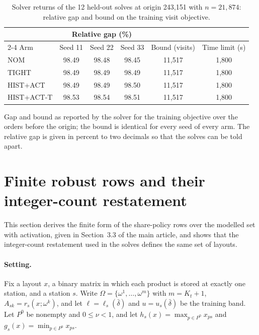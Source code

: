 \documentclass[11pt]{article}
\begin{document}
\begin{table}[htbp]
\centering
\caption{Solver returns of the 12 held-out solves at origin 243,151 with $n=21{,}874$: relative gap and bound on the training visit objective.}
\label{tab:s-solver}
\small
\begin{tabular}{@{}lccccc@{}}
\toprule
 & \multicolumn{3}{c}{Relative gap (\%)} & & \\
\cmidrule(lr){2-4}
Arm & Seed 11 & Seed 22 & Seed 33 & Bound (visits) & Time limit (s) \\
\midrule
NOM        & 98.49 & 98.48 & 98.45 & 11,517 & 1,800 \\
TIGHT      & 98.49 & 98.49 & 98.49 & 11,517 & 1,800 \\
HIST+ACT   & 98.49 & 98.49 & 98.50 & 11,517 & 1,800 \\
HIST+ACT-T & 98.53 & 98.54 & 98.51 & 11,517 & 1,800 \\
\bottomrule
\end{tabular}
\par\smallskip
\begin{minipage}{\linewidth}\footnotesize
Gap and bound as reported by the solver for the training objective over the orders before the origin; the bound is identical for every seed of every arm. The relative gap is given in percent to two decimals so that the solves can be told apart.
\end{minipage}
\end{table}

\section{Finite robust rows and their integer-count restatement}\label{sec:s-rows}
This section derives the finite form of the share-policy rows over the modelled set with activation, given in Section~3.3 of the main article, and shows that the integer-count restatement used in the solves defines the same set of layouts.

\paragraph{Setting.} Fix a layout $x$, a binary matrix in which each product is stored at exactly one station, and a station $s$. Write $\Omega=\{\omega^1,\dots,\omega^m\}$ with $m=K_t+1$, $A_{sk}=r_s(x;\omega^k)$, and let $\ell=\ell_s(\bar\delta)$ and $u=u_s(\bar\delta)$ be the training band. Let $P^0$ be nonempty and $0\le\nu<1$, and let $h_s(x)=\max_{p\in P^0}x_{ps}$ and $g_s(x)=\min_{p\in P^0}x_{ps}$.
\end{document}
